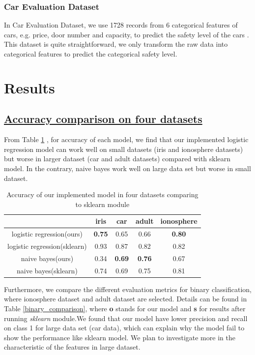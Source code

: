 \documentclass[11pt]{scrartcl}
\begin{document}
\subsubsection*{Car Evaluation Dataset}
In Car Evaluation Dataset, we use 1728 records from 6 categorical features of cars, e.g. price, door number and capacity, to predict the safety level of the cars \cite{bohanec1988knowledge}. This dataset is quite straightforward, we only transform the raw data into categorical features to predict the categorical safety level.


\section{Results}
\subsection*{\underline{Accuracy comparison on four datasets}}

From Table \ref{accuracy_fourdata} , for accuracy of each model, we find that our implemented logistic regression model can work well on small datasets (iris and ionosphere datasets) but worse in larger dataset (car and adult datasets) compared with sklearn model. In the contrary, naive bayes work well on large data set but worse in small dataset.

\begin{table}[H]
	\centering
	\begin{tabular}{c|cccc}
		\hline
		 & iris	 & car & adult & ionosphere \\
		\hline
		logistic regression(ours) &  \textbf{0.75} & 0.65 & 0.66 & \textbf{0.80}\\
		logistic regression(sklearn) & 0.93 & 0.87 & 0.82 & 0.82\\
		naive bayes(ours) & 0.34 &  \textbf{0.69} & \textbf{0.76} & 0.67 \\
		naive bayes(sklearn) & 0.74 & 0.69 & 0.75 & 0.81 \\
		\hline
	\end{tabular} 
	\caption{Accuracy of our implemented model in four datasets comparing to sklearn module}
	\label{accuracy_fourdata}
\end{table}

Furthermore, we compare the different evaluation metrics for binary classification, where ionosphere dataset and adult dataset are selected. Details can be found in Table \ref{binary_comparison}, where \textbf{o} stands for our model and \textbf{s} for results after running \textit{sklearn} module.We found that our model have lower precision and recall on class 1 for large data set (car data), which can explain why the model fail to show the performance like sklearn model. We plan to investigate more in the characteristic of the features in large dataset.
\end{document}
